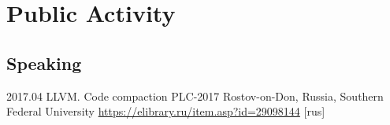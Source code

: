 \documentclass[11pt,a4paper]{moderncv}
\newcommand{\EngRus}[2]{#1}
\newcommand{\BirthPlaceOfValour}{\EngRus{Rostov-on-Don, Russia}{Ростов-на-Дону, Россия}}
\newcommand{\WorkSingleDate}[2]{\small{\EngRus{#2.#1}{#1.#2}}}
\begin{document}
\section{\EngRus{Public Activity}{Публичная деятельность}}
\subsection{\EngRus{Speaking}{Конференции}}
\cventry
{\WorkSingleDate{04}{2017}}
{\EngRus{LLVM. Code compaction}{Преобразование по уплотнению кода в LLVM}}
{\EngRus{PLC-2017}{Языки программирования и компиляторы 2017}}
{\BirthPlaceOfValour, \EngRus{Southern Federal University}{Южный Федеральный Университет}}
{\newline\url{https://elibrary.ru/item.asp?id=29098144} \EngRus{[rus]}{}}
{}{}
\end{document}
